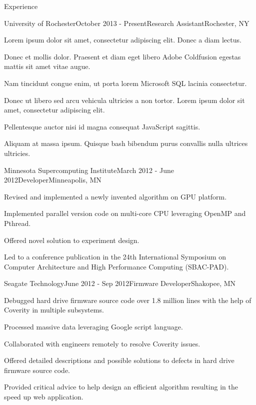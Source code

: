 \documentclass{resume} %
\begin{document}
\begin{rSection}{Experience}

\begin{rSubsection}{University of Rochester}{October 2013 - Present}{Research Assistant}{Rochester, NY}
\item Lorem ipsum dolor sit amet, consectetur adipiscing elit. Donec a diam lectus.
\item Donec et mollis dolor. Praesent et diam eget libero Adobe Coldfusion egestas mattis sit amet vitae augue.
\item Nam tincidunt congue enim, ut porta lorem Microsoft SQL lacinia consectetur.
\item Donec ut libero sed arcu vehicula ultricies a non tortor. Lorem ipsum dolor sit amet, consectetur adipiscing elit.
\item Pellentesque auctor nisi id magna consequat JavaScript sagittis.
\item Aliquam at massa ipsum. Quisque bash bibendum purus convallis nulla ultrices ultricies.
\end{rSubsection}


\begin{rSubsection}{Minnesota Supercomputing Institute}{March 2012 - June 2012}{Developer}{Minneapolis, MN}
\item Revised and implemented a newly invented algorithm on GPU platform.
\item Implemented parallel version code on multi-core CPU leveraging OpenMP and Pthread.
\item Offered novel solution to experiment design.
\item Led to a conference publication in the 24th International Symposium on Computer Architecture and High Performance Computing (SBAC-PAD).
\end{rSubsection}


\begin{rSubsection}{Seagate Technology}{June 2012 - Sep 2012}{Firmware Developer}{Shakopee, MN}
\item Debugged hard drive firmware source code over 1.8 million lines with the help of Coverity in multiple subsystems.
\item Processed massive data leveraging Google script language.
\item Collaborated with engineers remotely to resolve Coverity issues.
\item Offered detailed descriptions and possible solutions to defects in hard drive firmware source code.
\item Provided critical advice to help design an efficient algorithm resulting in the speed up web application.
\end{rSubsection}

\end{rSection}
\end{document}
